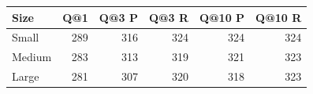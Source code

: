 \begin{tabular}{lrrrrr}
\toprule
Size & Q@1 & Q@3 P & Q@3 R & Q@10 P & Q@10 R \\
\midrule
Small & 289 & 316 & 324 & 324 & 324 \\
Medium & 283 & 313 & 319 & 321 & 323 \\
Large & 281 & 307 & 320 & 318 & 323 \\
\bottomrule
\end{tabular}
